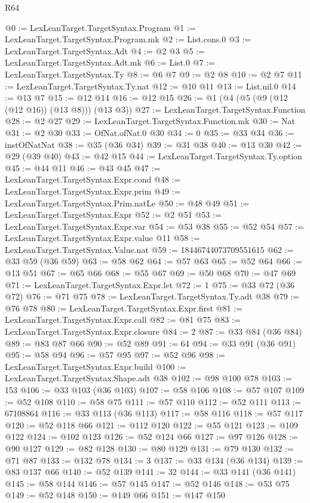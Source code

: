 \begin{lexlean}{R64}
\begin{coremodule}
@0 := LexLeanTarget.TargetSyntax.Program
@1 := LexLeanTarget.TargetSyntax.Program.mk
@2 := List.cons.{0}
@3 := LexLeanTarget.TargetSyntax.Adt
@4 := @2 @3
@5 := LexLeanTarget.TargetSyntax.Adt.mk
@6 := List.{0}
@7 := LexLeanTarget.TargetSyntax.Ty
@8 := @6 @7
@9 := @2 @8
@10 := @2 @7
@11 := LexLeanTarget.TargetSyntax.Ty.nat
@12 := @10 @11
@13 := List.nil.{0}
@14 := @13 @7
@15 := @12 @14
@16 := @12 @15
@26 := @1 (@4 (@5 (@9 (@12 (@12 @16)) (@13 @8))) (@13 @3))
@27 := LexLeanTarget.TargetSyntax.Function
@28 := @2 @27
@29 := LexLeanTarget.TargetSyntax.Function.mk
@30 := Nat
@31 := @2 @30
@33 := OfNat.ofNat.{0} @30
@34 := 0
@35 := @33 @34
@36 := instOfNatNat
@38 := @35 (@36 @34)
@39 := @31 @38
@40 := @13 @30
@42 := @29 (@39 @40)
@43 := @42 @15
@44 := LexLeanTarget.TargetSyntax.Ty.option
@45 := @44 @11
@46 := @43 @45
@47 := LexLeanTarget.TargetSyntax.Expr.cond
@48 := LexLeanTarget.TargetSyntax.Expr.prim
@49 := LexLeanTarget.TargetSyntax.Prim.natLe
@50 := @48 @49
@51 := LexLeanTarget.TargetSyntax.Expr
@52 := @2 @51
@53 := LexLeanTarget.TargetSyntax.Expr.var
@54 := @53 @38
@55 := @52 @54
@57 := LexLeanTarget.TargetSyntax.Expr.value @11
@58 := LexLeanTarget.TargetSyntax.Value.nat
@59 := 18446744073709551615
@62 := @33 @59 (@36 @59)
@63 := @58 @62
@64 := @57 @63
@65 := @52 @64
@66 := @13 @51
@67 := @65 @66
@68 := @55 @67
@69 := @50 @68
@70 := @47 @69
@71 := LexLeanTarget.TargetSyntax.Expr.let
@72 := 1
@75 := @33 @72 (@36 @72)
@76 := @71 @75
@78 := LexLeanTarget.TargetSyntax.Ty.adt @38
@79 := @76 @78
@80 := LexLeanTarget.TargetSyntax.Expr.first
@81 := LexLeanTarget.TargetSyntax.Expr.call
@82 := @81 @75
@83 := LexLeanTarget.TargetSyntax.Expr.closure
@84 := 2
@87 := @33 @84 (@36 @84)
@89 := @83 @87 @66
@90 := @52 @89
@91 := 64
@94 := @33 @91 (@36 @91)
@95 := @58 @94
@96 := @57 @95
@97 := @52 @96
@98 := LexLeanTarget.TargetSyntax.Expr.build
@100 := LexLeanTarget.TargetSyntax.Shape.adt @38
@102 := @98 @100 @78
@103 := 153
@106 := @33 @103 (@36 @103)
@107 := @58 @106
@108 := @57 @107
@109 := @52 @108
@110 := @58 @75
@111 := @57 @110
@112 := @52 @111
@113 := 67108864
@116 := @33 @113 (@36 @113)
@117 := @58 @116
@118 := @57 @117
@120 := @52 @118 @66
@121 := @112 @120
@122 := @55 @121
@123 := @109 @122
@124 := @102 @123
@126 := @52 @124 @66
@127 := @97 @126
@128 := @90 @127
@129 := @82 @128
@130 := @80 @129
@131 := @79 @130
@132 := @71 @87
@133 := @132 @78
@134 := 3
@137 := @33 @134 (@36 @134)
@139 := @83 @137 @66
@140 := @52 @139
@141 := 32
@144 := @33 @141 (@36 @141)
@145 := @58 @144
@146 := @57 @145
@147 := @52 @146
@148 := @53 @75
@149 := @52 @148
@150 := @149 @66
@151 := @147 @150

\end{coremodule}
\end{lexlean}
